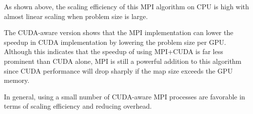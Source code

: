 As shown above, the scaling efficiency of this MPI algorithm on CPU is high with almost linear scaling when problem size is large. 

The CUDA-aware version shows that the MPI implementation can lower the speedup in CUDA implementation by lowering the problem size per GPU. Although this indicates that the speedup of using MPI+CUDA is far less prominent than CUDA alone, MPI is still a powerful addition to this algorithm since CUDA performance will drop sharply if the map size exceeds the GPU memory.

In general, using a small number of CUDA-aware MPI processes are favorable in terms of scaling efficiency and reducing overhead.